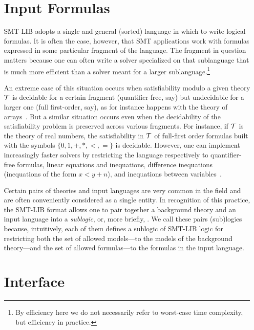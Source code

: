 \section{Input Formulas}

SMT-LIB adopts a single and general (sorted) language in which to write 
logical formulas.
It is often the case, however, that 
SMT applications work with formulas expressed in some particular fragment 
of the language.
The fragment in question matters
because one can often write a solver specialized on that sublanguage 
that is much more efficient than a solver meant for a larger sublanguage.\footnote{
By efficiency here we do not necessarily refer to worst-case time complexity,
but efficiency in practice.
}

An extreme case of this situation occurs
when satisfiability modulo a given theory $\mathcal{T}$
is decidable for a certain fragment (quantifier-free, say)
but undecidable for a larger one (full first-order, say),
as for instance happens with the theory of arrays~\cite{BraMS-VMCAI-06}.
But a similar situation occurs even
when the decidability of the satisfiability problem is preserved 
across various fragments.
For instance, 
if $\mathcal{T}$ is the theory of real numbers,
the satisfiability in $\mathcal{T}$ of full-first order formulas
built with the symbols $\{0,1,+,*,<,=\}$ is decidable.
However, one can implement increasingly faster solvers by restricting
the language respectively to quantifier-free formulas, 
linear equations and inequations,
difference inequations (inequations of the form $x < y + n$),
and
inequations between variables~\cite{Bozzanoetal2005TACAS}.

Certain pairs of theories and input languages are very common in the field
and are often conveniently considered as a single entity.
In recognition of this practice,
the SMT-LIB format allows one to pair together 
a background theory and an input language into a \emph{sublogic}, 
or, more briefly, .
We call these pairs (sub)logics because,
intuitively, 
each of them defines a sublogic of SMT-LIB logic
for restricting 
both the set of allowed models---to the models of the background theory---and 
the set of allowed formulas---to the formulas in the input language.


\section{Interface}

